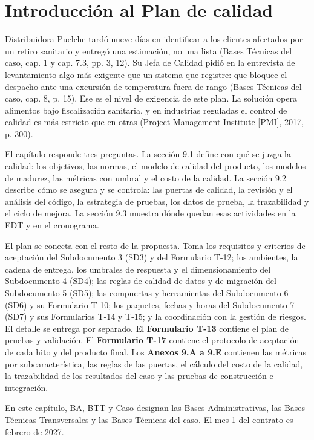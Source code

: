 \chapter{Introducción al Plan de calidad}
\label{cap:sd9}

Distribuidora Puelche tardó nueve días en identificar a los clientes afectados por un retiro sanitario y entregó una estimación, no una lista (Bases Técnicas del caso, cap. 1 y cap. 7.3, pp. 3, 12). Su Jefa de Calidad pidió en la entrevista de levantamiento algo más exigente que un sistema que registre: que bloquee el despacho ante una excursión de temperatura fuera de rango (Bases Técnicas del caso, cap. 8, p. 15). Ese es el nivel de exigencia de este plan. La solución opera alimentos bajo fiscalización sanitaria, y en industrias reguladas el control de calidad es más estricto que en otras (Project Management Institute [PMI], 2017, p. 300).

El capítulo responde tres preguntas. La sección 9.1 define con qué se juzga la calidad: los objetivos, las normas, el modelo de calidad del producto, los modelos de madurez, las métricas con umbral y el costo de la calidad. La sección 9.2 describe cómo se asegura y se controla: las puertas de calidad, la revisión y el análisis del código, la estrategia de pruebas, los datos de prueba, la trazabilidad y el ciclo de mejora. La sección 9.3 muestra dónde quedan esas actividades en la EDT y en el cronograma.

El plan se conecta con el resto de la propuesta. Toma los requisitos y criterios de aceptación del Subdocumento 3 (SD3) y del Formulario T-12; los ambientes, la cadena de entrega, los umbrales de respuesta y el dimensionamiento del Subdocumento 4 (SD4); las reglas de calidad de datos y de migración del Subdocumento 5 (SD5); las compuertas y herramientas del Subdocumento 6 (SD6) y su Formulario T-10; los paquetes, fechas y horas del Subdocumento 7 (SD7) y sus Formularios T-14 y T-15; y la coordinación con la gestión de riesgos. El detalle se entrega por separado. El \textbf{Formulario T-13} contiene el plan de pruebas y validación. El \textbf{Formulario T-17} contiene el protocolo de aceptación de cada hito y del producto final. Los \textbf{Anexos 9.A a 9.E} contienen las métricas por subcaracterística, las reglas de las puertas, el cálculo del costo de la calidad, la trazabilidad de los resultados del caso y las pruebas de construcción e integración.

En este capítulo, BA, BTT y Caso designan las Bases Administrativas, las Bases Técnicas Transversales y las Bases Técnicas del caso. El mes 1 del contrato es febrero de 2027.

